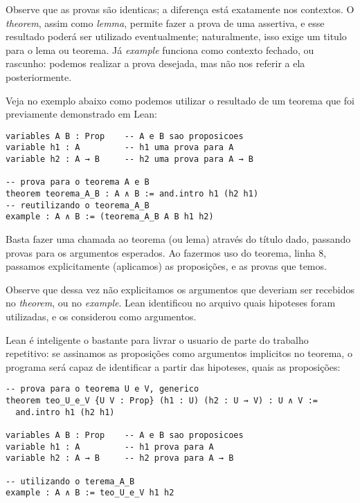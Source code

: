 Observe que as provas são identicas; a diferença está exatamente nos contextos. O \textit{theorem}, assim como \textit{lemma}, permite fazer a prova de uma assertiva, e esse resultado poderá ser utilizado eventualmente; naturalmente, isso exige um titulo para o lema ou teorema.
Já \textit{example} funciona como contexto fechado, ou rascunho: podemos realizar a prova desejada, mas não nos referir a ela posteriormente.

Veja no exemplo abaixo como podemos utilizar o resultado de um teorema que foi previamente demonstrado em Lean:

\vspace{5mm}
\begin{lstlisting}
variables A B : Prop    -- A e B sao proposicoes
variable h1 : A         -- h1 uma prova para A
variable h2 : A → B     -- h2 uma prova para A → B

-- prova para o teorema A e B
theorem teorema_A_B : A ∧ B := and.intro h1 (h2 h1)
-- reutilizando o teorema_A_B
example : A ∧ B := (teorema_A_B A B h1 h2)
\end{lstlisting}
\vspace{5mm}

\noindent Basta fazer uma chamada ao teorema (ou lema) através do título dado, passando provas para os argumentos esperados. Ao fazermos uso do teorema, linha 8, passamos explicitamente (aplicamos) as proposições, e as provas que temos.

Observe que dessa vez não explicitamos os argumentos que deveriam ser recebidos no \textit{theorem}, ou no \textit{example}. Lean identificou no arquivo quais hipoteses foram utilizadas, e os considerou como argumentos.

Lean é inteligente o bastante para livrar o usuario de parte do trabalho repetitivo: se assinamos as proposições como argumentos implicitos no teorema, o programa será capaz de identificar a partir das hipoteses, quais as proposições:

\vspace{5mm}
\begin{lstlisting}
-- prova para o teorema U e V, generico
theorem teo_U_e_V {U V : Prop} (h1 : U) (h2 : U → V) : U ∧ V :=
  and.intro h1 (h2 h1)

variables A B : Prop    -- A e B sao proposicoes
variable h1 : A         -- h1 prova para A
variable h2 : A → B     -- h2 prova para A → B

-- utilizando o terema_A_B
example : A ∧ B := teo_U_e_V h1 h2
\end{lstlisting}
\vspace{5mm}

